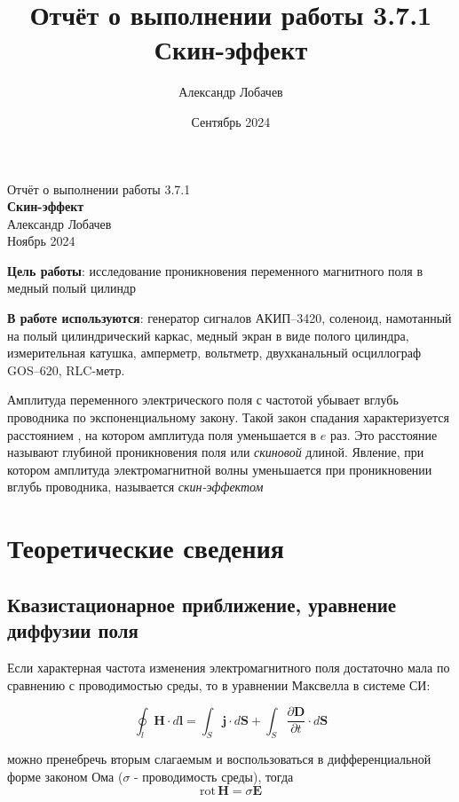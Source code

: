 \documentclass[a4paper, 12pt]{article} %
\title{{Отчёт о выполнении работы 3.7.1}\\
       \textbf{Скин-эффект}}
\author{Александр Лобачев}
\date{Сентябрь 2024}
\begin{document}
\begin{titlepage}
    \centering
    \vspace*{\fill}
    {\Huge{Отчёт о выполнении работы 3.7.1}}\\[1cm]
    {\LARGE \textbf{Скин-эффект}}\\[2cm]
    \vfill
    {\Large Александр Лобачев}\\[0.5cm]
    {\Large Ноябрь 2024}
    \vspace*{\fill}
\end{titlepage}


\tableofcontents
\newpage

\textbf{Цель работы}: исследование проникновения переменного магнитного поля в медный полый цилиндр 

\textbf{В работе используются}: генератор сигналов АКИП–3420, соленоид, намотанный на полый
цилиндрический каркас, медный экран в виде полого цилиндра, измерительная катушка, амперметр, вольтметр, двухканальный осциллограф GOS–620, RLC-метр.

 Амплитуда переменного электрического поля с частотой убывает вглубь проводника по экспоненциальному закону. Такой закон спадания характеризуется расстоянием , на котором амплитуда поля уменьшается в $e$ раз. Это расстояние
 называют глубиной проникновения поля или \textit{скиновой} длиной. Явление, при котором амплитуда электромагнитной волны уменьшается при проникновении вглубь проводника, называется \textit{скин-эффектом}

\section{Теоретические сведения}
 
\subsection{Квазистационарное приближение, уравнение диффузии поля}
Если характерная частота изменения электромагнитного поля достаточно мала по сравнению с проводимостью среды, то в уравнении Максвелла в системе СИ:

\[
\oint_{l} \mathbf{H} \cdot d\mathbf{l} = \int_S \mathbf{j} \cdot d\mathbf{S} + \int_S \frac{\partial \mathbf{D}}{\partial t} \cdot d\mathbf{S}
\]

можно пренебречь вторым слагаемым и воспользоваться в дифференциальной форме законом Ома ($\sigma$ - проводимость среды), тогда
\begin{equation}
   \text{rot} \, \mathbf{H} = \sigma \mathbf{E} 
   \label{Amper}
\end{equation}
\end{document}

